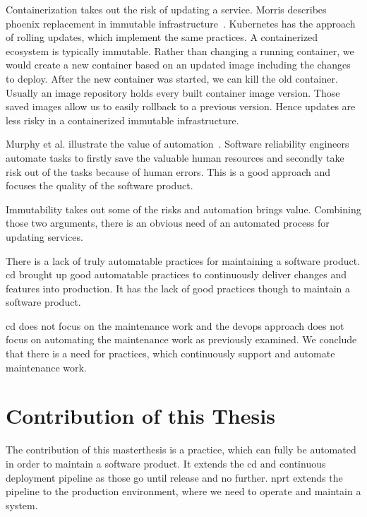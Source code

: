 Containerization takes out the risk of updating a service. Morris describes phoenix
replacement in immutable infrastructure~\cite{infra_as_code_phoenix}. Kubernetes has the
approach of rolling updates, which implement the same practices. A containerized ecosystem
is typically immutable. Rather than changing a running container, we would create a new
container based on an updated image including the changes to deploy. After the new
container was started, we can kill the old container. Usually an image repository holds
every built container image version. Those saved images allow us to easily rollback to a
previous version. Hence updates are less risky in a containerized immutable
infrastructure.

Murphy et al. illustrate the value of automation~\cite{sre_automation}. Software
reliability engineers automate tasks to firstly save the valuable human resources and
secondly take risk out of the tasks because of human errors. This is a good approach and
focuses the quality of the software product.

Immutability takes out some of the risks and automation brings value. Combining those two
arguments, there is an obvious need of an automated process for updating services.

There is a lack of truly automatable practices for maintaining a software
product. \gls{cd} brought up good automatable practices to continuously deliver changes
and features into production. It has the lack of good practices though to maintain a
software product.

\gls{cd} does not focus on the maintenance work and the devops approach does not focus on
automating the maintenance work as previously examined. We conclude that there is a need
for practices, which continuously support and automate maintenance work.

\section{Contribution of this Thesis}

The contribution of this masterthesis is a practice, which can fully be automated in order
to maintain a software product. It extends the \gls{cd} and continuous deployment pipeline
as those go until release and no further. \gls{nprt} extends the pipeline to the
production environment, where we need to operate and maintain a system.

